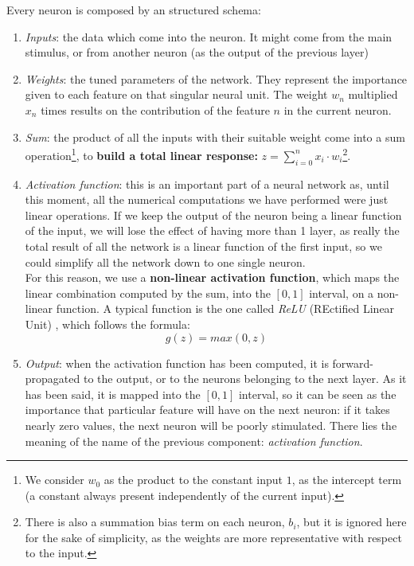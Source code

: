 Every neuron is composed by an structured schema:
\begin{enumerate}
	\item \emph{Inputs}: the data which come into the neuron. It might come from the main stimulus, or from another neuron (as the output of the previous layer)
	\item \emph{Weights}: the tuned parameters of the network. They represent the importance given to each feature on that singular neural unit. The weight $w_n$ multiplied $x_n$ times results on the contribution of the feature $n$ in the current neuron. 
	\item \emph{Sum}: the product of all the inputs with their suitable weight come into a sum operation\footnote{We consider $w_0$ as the product to the constant input $1$, as the intercept term (a constant always present independently of the current input).}, to \textbf{build a total linear response:} $ z = \sum_{i=0}^{n}x_i \cdot w_i$\footnote{There is also a summation bias term on each neuron, $b_i$, but it is ignored here for the sake of simplicity, as the weights are more representative with respect to the input.}.
	\item \emph{Activation function}: this is an important part of a neural network as, until this moment, all the numerical computations we have performed were just linear operations. If we keep the output of the neuron being a linear function of the input, we will lose the effect of having more than 1 layer, as really the total result of all the network is a linear function of the first input, so we could simplify all the network down to one single neuron. \\
	
	For this reason, we use a \textbf{non-linear activation function}, which maps the linear combination computed by the sum, into the $[0,1]$ interval, on a non-linear function. A typical function is the one called \emph{ReLU} (REctified Linear Unit) \cite{relu}, which follows the formula:
	\begin{equation}
		g(z) = max(0, z)
		\label{eqn:1_relu}
	\end{equation}
	
	\item \emph{Output}: when the activation function has been computed, it is forward-propagated to the output, or to the neurons belonging to the next layer. As it has been said, it is mapped into the $[0, 1]$ interval, so it can be seen as the importance that particular feature will have on the next neuron: if it takes nearly zero values, the next neuron will be poorly stimulated. There lies the meaning of the name of the previous component: \emph{activation function}.
\end{enumerate}

